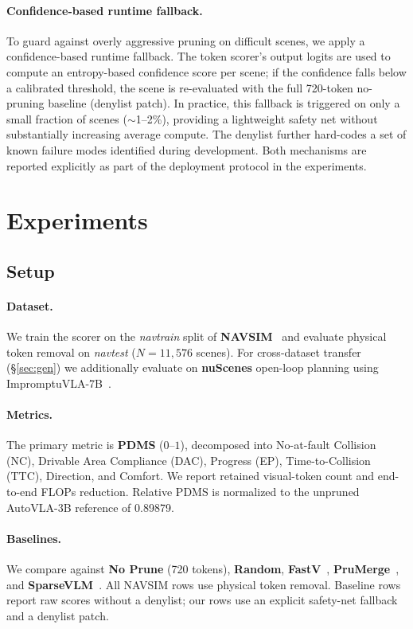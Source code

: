 \documentclass[letterpaper]{article} %
\begin{document}
\paragraph{Confidence-based runtime fallback.}
To guard against overly aggressive pruning on difficult scenes, we apply a
confidence-based runtime fallback. The token scorer's output logits are used to
compute an entropy-based confidence score per scene; if the confidence falls
below a calibrated threshold, the scene is re-evaluated with the full 720-token
no-pruning baseline (denylist patch). In practice, this fallback is triggered on
only a small fraction of scenes ($\sim$1--2\%), providing a lightweight safety
net without substantially increasing average compute. The denylist further
hard-codes a set of known failure modes identified during development. Both
mechanisms are reported explicitly as part of the deployment protocol in the
experiments.



\section{Experiments}
\label{sec:exp}

\subsection{Setup}
\label{sec:setup}

\paragraph{Dataset.}
We train the scorer on the \emph{navtrain} split of \textbf{NAVSIM}~\citep{navsim2024}
and evaluate physical token removal on \emph{navtest} ($N{=}11{,}576$ scenes).
For cross-dataset transfer (\S\ref{sec:gen}) we additionally evaluate on
\textbf{nuScenes} open-loop planning using ImpromptuVLA-7B~\citep{impromptuvla2025}.

\paragraph{Metrics.}
The primary metric is \textbf{PDMS} ($0$--$1$), decomposed into No-at-fault
Collision (NC), Drivable Area Compliance (DAC), Progress (EP),
Time-to-Collision (TTC), Direction, and Comfort. We report retained visual-token
count and end-to-end FLOPs reduction. Relative PDMS is normalized to the
unpruned AutoVLA-3B reference of 0.89879.

\paragraph{Baselines.}
We compare against \textbf{No Prune} (720 tokens), \textbf{Random},
\textbf{FastV}~\citep{fastv2024}, \textbf{PruMerge}~\citep{shang2024llavaprumerge},
and \textbf{SparseVLM}~\citep{sparsevlm2025}. All NAVSIM rows use physical token
removal. Baseline rows report raw scores without a denylist; our rows use an
explicit safety-net fallback and a denylist patch.
\end{document}
